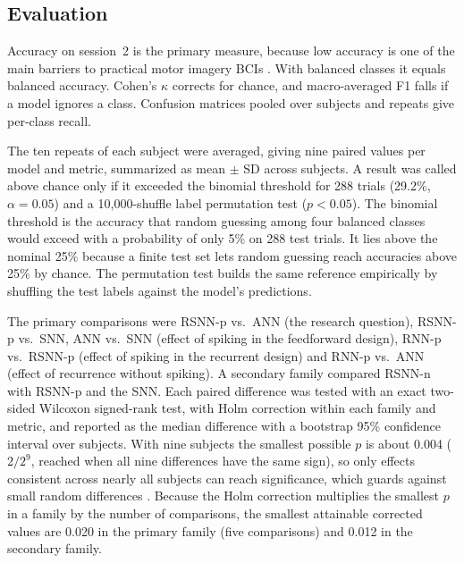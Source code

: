 \documentclass[conference]{IEEEtran}
\begin{document}
\subsection{Evaluation}
\label{sec:eval}

Accuracy on session~2 is the primary measure, because low accuracy is one of the main barriers to practical motor imagery BCIs \cite{padfield2019}. With balanced classes it equals balanced accuracy. Cohen's $\kappa$ corrects for chance, and macro-averaged F1 falls if a model ignores a class. Confusion matrices pooled over subjects and repeats give per-class recall.

The ten repeats of each subject were averaged, giving nine paired values per model and metric, summarized as mean $\pm$ SD across subjects. A result was called above chance only if it exceeded the binomial threshold for 288 trials (29.2\%, $\alpha = 0.05$) \cite{combrisson2015} and a 10{,}000-shuffle label permutation test ($p < 0.05$). The binomial threshold is the accuracy that random guessing among four balanced classes would exceed with a probability of only 5\% on 288 test trials. It lies above the nominal 25\% because a finite test set lets random guessing reach accuracies above 25\% by chance. The permutation test builds the same reference empirically by shuffling the test labels against the model's predictions.

The primary comparisons were RSNN-p vs.\ ANN (the research question), RSNN-p vs.\ SNN, ANN vs.\ SNN (effect of spiking in the feedforward design), RNN-p vs.\ RSNN-p (effect of spiking in the recurrent design) and RNN-p vs.\ ANN (effect of recurrence without spiking). A secondary family compared RSNN-n with RSNN-p and the SNN. Each paired difference was tested with an exact two-sided Wilcoxon signed-rank test, with Holm correction within each family and metric, and reported as the median difference with a bootstrap 95\% confidence interval over subjects. With nine subjects the smallest possible $p$ is about 0.004 ($2/2^9$, reached when all nine differences have the same sign), so only effects consistent across nearly all subjects can reach significance, which guards against small random differences \cite{tangermann2012}. Because the Holm correction multiplies the smallest $p$ in a family by the number of comparisons, the smallest attainable corrected values are 0.020 in the primary family (five comparisons) and 0.012 in the secondary family.
\end{document}
